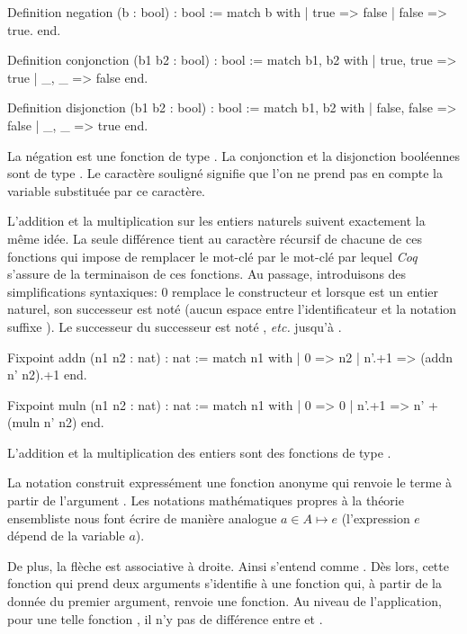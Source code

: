 \documentclass[a4paper,10pt]{article}
\begin{document}
\begin{coq}[]
Definition negation (b : bool) : bool :=
  match b with
  | true => false
  | false => true.
  end.

Definition conjonction (b1 b2 : bool) : bool :=
  match b1, b2 with
  | true, true => true
  | _, _ => false
  end.

Definition disjonction (b1 b2 : bool) : bool :=
  match b1, b2 with
  | false, false => false
  | _, _ => true
  end.
\end{coq}

La négation est une fonction de type .  La conjonction et la disjonction booléennes sont de
type .  Le caractère souligné \C{\_} signifie que l'on ne prend pas en compte la
variable substituée par ce caractère.

L'addition et la multiplication sur les entiers naturels suivent exactement la même idée.  La seule
différence tient au caractère récursif de chacune de ces fonctions qui impose de remplacer le mot-clé
 par le mot-clé  par lequel \emph{Coq} s'assure de la terminaison de ces fonctions.  Au
passage, introduisons des simplifications syntaxiques: \(0\) remplace le constructeur  et lorsque 
est un entier naturel, son successeur est noté  (aucun espace entre l'identificateur et la notation
suffixe ).  Le successeur du successeur est noté , \emph{etc.} jusqu'à .

\begin{coq}[]
Fixpoint addn (n1 n2 : nat) : nat :=
  match n1 with
  | 0 => n2
  | n'.+1 => (addn n' n2).+1
  end.

Fixpoint muln (n1 n2 : nat) : nat :=
  match n1 with
  | 0 => 0
  | n'.+1 => n' + (muln n' n2)
  end.
\end{coq}

L'addition et la multiplication des entiers sont des fonctions de type .

La notation  construit expressément une fonction anonyme qui renvoie le terme  à
partir de l'argument .  Les notations mathématiques propres à la théorie ensembliste nous font écrire
de manière analogue \(a\in A \mapsto e\) (l'expression \(e\) dépend de la variable \(a\)).

De plus, la flèche est associative à droite.  Ainsi  s'entend comme .  Dès
lors, cette fonction qui prend deux arguments s'identifie à une fonction qui, à partir de la donnée du
premier argument, renvoie une fonction.  Au niveau de l'application, pour une telle fonction , il n'y
pas de différence entre  et .
\end{document}
